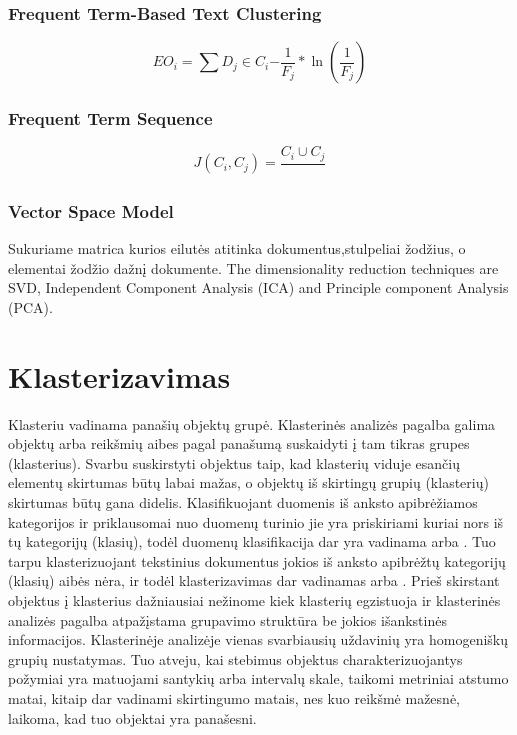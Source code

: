 \documentclass{VUMIFInfKursinis}
\begin{document}
\subsubsection{Frequent Term-Based Text Clustering}

\begin{equation}
	EO_i=\sum{D_j \in C_i}{-\frac{1}{F_j}*\ln(\frac{1}{F_j})}
\end{equation} 
\subsubsection{Frequent Term Sequence}
\begin{equation}
	J(C_i,C_j) = \frac{C_i \cup C_j}{}
\end{equation} 
\subsubsection{Vector Space Model}
Sukuriame matrica kurios eilutės atitinka dokumentus,stulpeliai žodžius, o elementai žodžio dažnį dokumente.
The dimensionality reduction techniques are SVD, Independent Component Analysis (ICA) and Principle component Analysis (PCA). 


\section{Klasterizavimas}

Klasteriu vadinama panašių objektų grupė. Klasterinės analizės pagalba galima objektų arba reikšmių aibes pagal panašumą suskaidyti į tam tikras grupes (klasterius). Svarbu suskirstyti objektus taip, kad klasterių viduje esančių elementų skirtumas būtų labai mažas, o objektų iš skirtingų grupių (klasterių) skirtumas būtų gana didelis. 
Klasifikuojant duomenis iš anksto apibrėžiamos kategorijos ir priklausomai nuo duomenų turinio jie yra priskiriami kuriai nors iš tų kategorijų (klasių), todėl duomenų klasifikacija dar yra vadinama  arba . Tuo tarpu klasterizuojant tekstinius dokumentus jokios iš anksto apibrėžtų kategorijų (klasių) aibės nėra, ir todėl klasterizavimas dar vadinamas  arba . Prieš skirstant objektus į klasterius dažniausiai nežinome kiek klasterių egzistuoja ir klasterinės analizės pagalba atpažįstama grupavimo struktūra be jokios išankstinės informacijos. 
Klasterinėje analizėje vienas svarbiausių uždavinių yra homogeniškų grupių nustatymas. Tuo atveju, kai stebimus objektus charakterizuojantys požymiai yra matuojami santykių arba intervalų skale, taikomi metriniai atstumo matai, kitaip dar vadinami skirtingumo matais, nes kuo reikšmė mažesnė, laikoma, kad tuo objektai yra panašesni.
\end{document}
